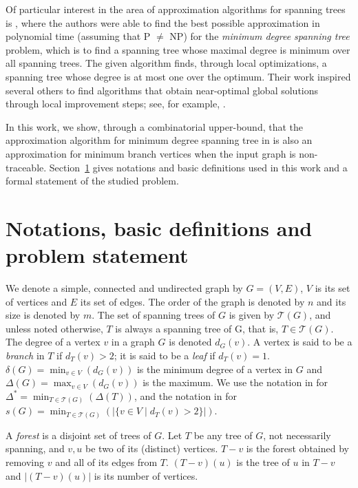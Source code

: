 \documentclass[12pt]{article}
\begin{document}
Of particular interest in the area of approximation algorithms for spanning trees is \cite{furer1992}, where the authors were able to find the best possible approximation in polynomial time (assuming that P $\neq$ NP) for the \emph{minimum degree spanning tree} problem, which is to find a spanning tree whose maximal degree is minimum over all spanning trees.
The given algorithm finds, through local optimizations, a spanning tree whose degree is at most one over the optimum. 
Their work inspired several others to find algorithms that obtain near-optimal global solutions through local improvement steps; see, for example, \cite{salamon2010, lu1996, chimani2015}.

In this work, we show, through a combinatorial upper-bound, that the approximation algorithm for minimum degree spanning tree in \cite{furer1992} is also an approximation for minimum branch vertices when the input graph is non-traceable.
Section~\ref{sec:notations} gives notations and basic definitions used in this work and a formal statement of the studied problem. 

\section{Notations, basic definitions and problem statement} \label{sec:notations}

We denote a simple, connected and undirected graph by $G = (V, E)$, $V$ is its set of vertices and $E$ its set of edges.
The order of the graph is denoted by $n$ and its size is denoted by $m$.
The set of spanning trees of $G$ is given by $\mathcal{T}(G)$, and unless noted otherwise, $T$ is always a spanning tree of G, that is, $T \in \mathcal{T}(G)$.
The degree of a vertex $v$ in a graph $G$ is denoted $d_G(v)$.
A vertex is said to be a \emph{branch} in $T$ if $d_T(v) > 2$; it is said to be a \emph{leaf} if $d_T(v) = 1$.
$\delta(G) = \min_{v \in V}(d_G(v))$ is the minimum degree of a vertex in $G$ and $\Delta(G) = \max_{v \in V}(d_G(v))$ is the maximum.
We use the notation in \cite{furer1992} for $\Delta^* = \min_{T \in \mathcal{T}(G)}(\Delta(T))$, and the notation in \cite{gargano2004} for $s(G) = \min_{T \in \mathcal{T}(G)}(|\{v \in V \mid d_T(v) > 2 \}|)$.

A \emph{forest} is a disjoint set of trees of $G$.
Let $T$ be any tree of $G$, not necessarily spanning, and $v, u$ be two of its (distinct) vertices.
$T - v$ is the forest obtained by removing $v$ and all of its edges from $T$.
$(T - v)(u)$ is the tree of $u$ in $T - v$ and $|(T - v)(u)|$ is its number of vertices.
\end{document}
